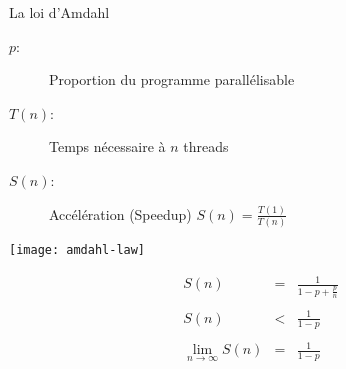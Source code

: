 
\begingroup

\begin{frame}{La loi d'Amdahl}
    \begin{description}
    \item[$p$: ] Proportion du programme parallélisable 
    \item[$T(n)$: ] Temps nécessaire à $n$ threads
    \item[$S(n)$: ] Accélération (Speedup) $S(n) = \frac{T(1)}{T(n)}$ 
    \end{description}
    \pause
    \hspace{\fill}
    \begin{minipage}{.6\textwidth}
    \texttt{[image: amdahl-law]}
    \end{minipage}
    \hspace{\fill}
    \begin{minipage}{.35\textwidth}
      \vspace{-1cm}
      $$
      \begin{array}{rcl}
        \displaystyle S(n) &\displaystyle =& \displaystyle \frac{1}{1-p + \frac{p}{n}}\\
        \\
        \displaystyle S(n) &\displaystyle <& \displaystyle\frac{1}{1-p}\\
        \\
        \displaystyle \lim_{n\rightarrow \infty} S(n) &\displaystyle =& \displaystyle \frac{1}{1-p}
      \end{array}
      $$
    \end{minipage}
    \hspace{\fill}
\end{frame}

\endgroup
\endinput
